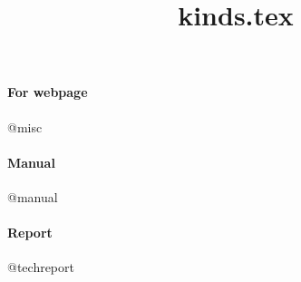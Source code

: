 \documentclass[a4paper]{article}
\title{kinds.tex}
\date{}
\begin{document}
    \maketitle
    \paragraph{For webpage}
        @misc
    \paragraph{Manual}
        @manual
    \paragraph{Report}
        @techreport
\end{document}
